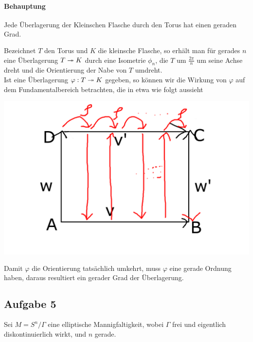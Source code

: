 \documentclass{book}
\begin{document}
\paragraph{Behauptung}
Jede Überlagerung der Kleinschen Flasche durch den Torus hat einen geraden Grad.
\begin{Beweis}{}
	Bezeichnet $T$ den Torus und $K$ die kleinsche Flasche, so erhält man für gerades $n$ eine Überlagerung $T\overset{}{\twoheadrightarrow}K$ durch eine Isometrie $\phi_n$, die $T$ um $\frac{2\pi}{n}$ um seine Achse dreht und die Orientierung der Nabe von $T$ umdreht.\\
	Ist eine Überlagerung $\varphi : T \overset{}{\twoheadrightarrow} K$ gegeben, so können wir die Wirkung von $\varphi$ auf dem Fundamentalbereich betrachten, die in etwa wie folgt aussieht
	\begin{center}
		\includegraphics[scale = 0.15]{Skizze4.png}	
	\end{center}
	Damit $\varphi$ die Orientierung tatsächlich umkehrt, muss $\varphi$ eine gerade Ordnung haben, daraus resultiert ein gerader Grad der Überlagerung.
\end{Beweis}

\subsection{Aufgabe 5}
Sei $M = S^n / \Gamma$ eine elliptische Mannigfaltigkeit, wobei $\Gamma$ frei und eigentlich diskontinuierlich wirkt, und $n$ gerade.
\end{document}
